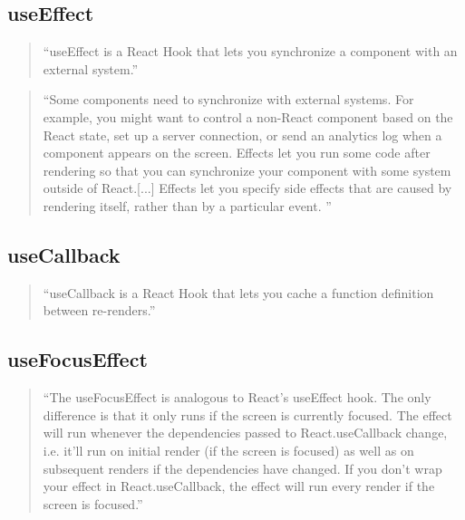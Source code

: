 \begin{spacing}{1}
    \subsection{useEffect}\label{subsec:useeffect}
    \begin{quotation}
        ``useEffect is a React Hook that lets you synchronize a component
        with an external system.''~\cite{useEffect}

    \end{quotation}
    \begin{quotation}
        ``Some components need to synchronize with external systems.
        For example, you might want to control a non-React component based on the React state, set up a server connection,
        or send an analytics log when a component appears on the screen.
        Effects let you run some code after rendering so that you can synchronize your component with some system outside of React.[...]
        Effects let you specify side effects that are caused by rendering itself,
        rather than by a particular event. ''
        \cite{Synchronizing-with-effects}


    \end{quotation}


    \subsection{useCallback}\label{subsec:usecallback}
    \begin{quotation}
        ``useCallback is a React Hook that lets you cache a function definition between re-renders.''
        \cite{useCallback}
    \end{quotation}


    \subsection{useFocusEffect}\label{subsec:usefocuseffect}
    \begin{quotation}
        ``The useFocusEffect is analogous to React's useEffect hook. The only difference is that it only runs if the screen
        is currently focused.
        The effect will run whenever the dependencies passed to React.useCallback change,
        i.e. it'll run on initial render (if the screen is focused) as well as on subsequent renders if the dependencies
        have changed. If you don't wrap your effect in React.useCallback, the effect will run every render if the screen
        is focused.'' \cite{useFocusEffect}

    \end{quotation}


\end{spacing}


